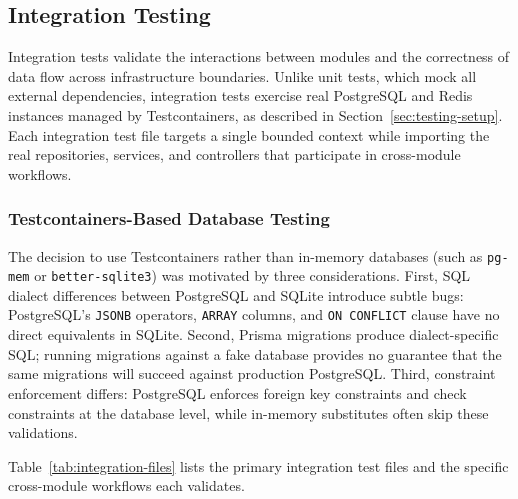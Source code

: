 
\subsection{Integration Testing}
\label{sec:integration-testing}

Integration tests validate the interactions between modules and the correctness of data flow across infrastructure boundaries. Unlike unit tests, which mock all external dependencies, integration tests exercise real PostgreSQL and Redis instances managed by Testcontainers, as described in Section~\ref{sec:testing-setup}. Each integration test file targets a single bounded context while importing the real repositories, services, and controllers that participate in cross-module workflows.

\subsubsection{Testcontainers-Based Database Testing}

The decision to use Testcontainers rather than in-memory databases (such as \texttt{pg-mem} or \texttt{better-sqlite3}) was motivated by three considerations. First, SQL dialect differences between PostgreSQL and SQLite introduce subtle bugs: PostgreSQL's \texttt{JSONB} operators, \texttt{ARRAY} columns, and \texttt{ON CONFLICT} clause have no direct equivalents in SQLite. Second, Prisma migrations produce dialect-specific SQL; running migrations against a fake database provides no guarantee that the same migrations will succeed against production PostgreSQL. Third, constraint enforcement differs: PostgreSQL enforces foreign key constraints and check constraints at the database level, while in-memory substitutes often skip these validations.

Table~\ref{tab:integration-files} lists the primary integration test files and the specific cross-module workflows each validates.

